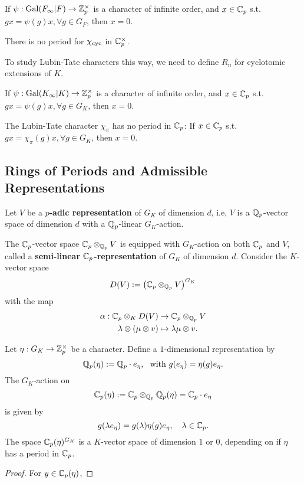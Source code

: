 \begin{theorem}
    If $\psi : \operatorname{Gal}(F_\infty|F)\to\mathbb{Z}_p^\times$
    is a character of infinite order,
    and $x\in\mathbb{C}_p$ s.t. $gx = \psi(g)x, \forall g\in G_F$, then $x = 0$.
\end{theorem}

\begin{corollary}
    There is no period for $\chi_{\mathrm{cyc}}$ in $\mathbb{C}_p^\times$.
\end{corollary}

To study Lubin-Tate characters this way, we need to define $R_n$ for cyclotomic extensions of $K$.

\begin{corollary}
    If $\psi : \operatorname{Gal}(K_\infty|K)\to\mathbb{Z}_p^\times$
    is a character of infinite order,
    and $x\in\mathbb{C}_p$ s.t. $gx = \psi(g)x, \forall g\in G_K$, then $x = 0$.
\end{corollary}

\begin{corollary}
    The Lubin-Tate character $\chi_\pi$ has no period in $\mathbb{C}_p$:
    If $x\in\mathbb{C}_p$ s.t. $gx = \chi_\pi(g)x, \forall g\in G_K$, then $x = 0$.
\end{corollary}


\subsection{Rings of Periods and Admissible Representations}

Let $V$ be a \textbf{$p$-adic representation} of $G_K$ of dimension $d$, i.e, $V$ is a $\mathbb{Q}_p$-vector space of dimension $d$ with a $\mathbb{Q}_p$-linear $G_K$-action.

The $\mathbb{C}_p$-vector space $\mathbb{C}_p\otimes_{\mathbb{Q}_p} V$ is equipped with $G_K$-action on both $\mathbb{C}_p$ and $V$,
called a \textbf{semi-linear $\mathbb{C}_p$-representation} of $G_K$ of dimension $d$.
Consider the $K$-vector space \[D(V) := \left( \mathbb{C}_p\otimes_{\mathbb{Q}_p} V  \right)^{G_K}\]
with the map \begin{align*}
    \alpha : \mathbb{C}_p\otimes_{K} D(V)&\to \mathbb{C}_p\otimes_{\mathbb{Q}_p} V\\
    \lambda\otimes(\mu\otimes v)&\mapsto \lambda\mu\otimes v.
\end{align*}


\begin{example}
Let $\eta : G_K\to\mathbb{Z}_p^\times$ be a character.
Define a $1$-dimensional representation by\[\mathbb{Q}_p(\eta) := \mathbb{Q}_p\cdot e_\eta,\ \text{ with } g(e_\eta) = \eta(g)e_\eta.\]
The $G_K$-action on \[\mathbb{C}_p(\eta) := \mathbb{C}_p\otimes_{\mathbb{Q}_p} \mathbb{Q}_p(\eta) = \mathbb{C}_p\cdot e_\eta\]
is given by \[g(\lambda e_\eta) = g(\lambda) \eta(g)e_\eta,\quad \lambda\in\mathbb{C}_p.\]
The space $\mathbb{C}_p(\eta)^{G_K}$ is a $K$-vector space of dimension $1$ or $0$, depending on if $\eta$ has a period in $\mathbb{C}_p$.

\begin{proof}
    For $y\in\mathbb{C}_p(\eta)$,
\end{proof}
\end{example}

